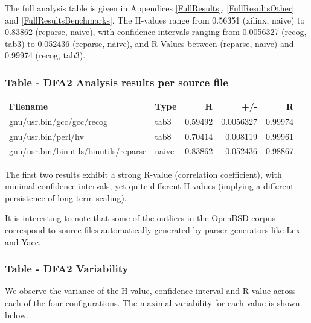 \documentclass[12pt]{article}
\begin{document}
The full analysis table is given in Appendices \ref{FullResults}, \ref{FullResultsOther} and \ref{FullResultsBenchmarks}.  The H-values range from 0.56351 (xilinx, naive) to 0.83862 (rcparse, naive), with confidence intervals ranging from 0.0056327 (recog, tab3) to 0.052436 (rcparse, naive), and R-Values between (rcparse, naive) and 0.99974 (recog, tab3).

\subsubsection{Table - DFA2 Analysis results per source file}
\begin{longtable}{l l r r r}
\textbf{Filename} & \textbf{Type} & \textbf{H} & \textbf{+/-} & \textbf{R} \\

{gnu/usr.bin/gcc/gcc/recog} & tab3 & 0.59492 & 0.0056327 & 0.99974 \\
{gnu/usr.bin/perl/hv} & tab8 & 0.70414 & 0.008119 & 0.99961 \\
{gnu/usr.bin/binutils/binutils/rcparse} & naive & 0.83862 & 0.052436 & 0.98867 \\



\end{longtable}

The first two results exhibit a strong R-value (correlation coefficient), with minimal confidence intervals, yet quite different H-values (implying a different persistence of long term scaling).

It is interesting to note that some of the outliers in the OpenBSD corpus correspond to source files automatically generated by parser-generators like Lex and Yacc. %


\subsubsection{Table - DFA2 Variability}\label{DetailsResultsVariance}
We observe the variance of the H-value, confidence interval and R-value across each of the four configurations.  The maximal variability for each value is shown below.
\end{document}
